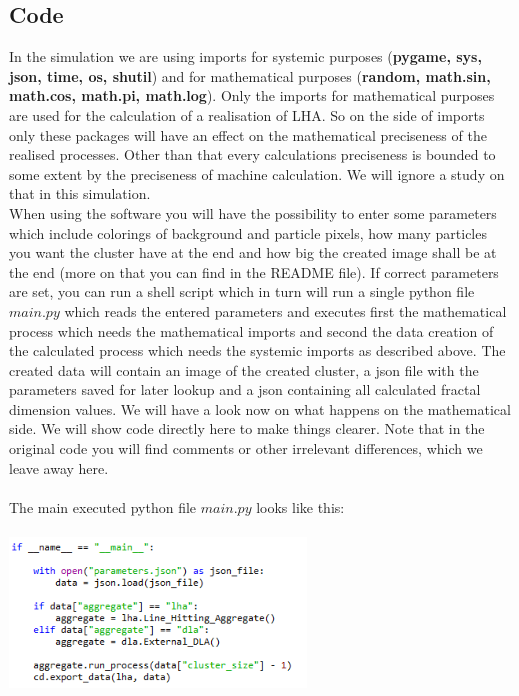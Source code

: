 \documentclass[12pt,a4paper]{scrartcl}
\numberwithin{equation}{subsection}
\newcommand{\1}{\mathbbm{1}}
\numberwithin{equation}{section}
\theoremstyle{definition}
\begin{document}
\subsection{Code}
In the simulation we are using imports for systemic purposes (\textbf{pygame, sys, json, time, os, shutil}) and for mathematical purposes (\textbf{random, math.sin, math.cos, math.pi, math.log}). Only the imports for mathematical purposes are used for the calculation of a realisation of LHA. So on the side of imports only these packages will have an effect on the mathematical preciseness of the realised processes. Other than that every calculations preciseness is bounded to some extent by the preciseness of machine calculation. We will ignore a study on that in this simulation. \\
When using the software you will have the possibility to enter some parameters which include colorings of background and particle pixels, how many particles you want the cluster have at the end and how big the created image shall be at the end (more on that you can find in the README file). If correct parameters are set, you can run a shell script which in turn will run a single python file $\mathit{main.py}$ which reads the entered parameters and executes first the mathematical process which needs the mathematical imports and second the data creation of the calculated process which needs the systemic imports as described above. The created data will contain an image of the created cluster, a json file with the parameters saved for later lookup and a json containing all calculated fractal dimension values. We will have a look now on what happens on the mathematical side. We will show code directly here to make things clearer. Note that in the original code you will find comments or other irrelevant differences, which we leave away here. \\
\\The main executed python file $\mathit{main.py}$ looks like this:\\
\\
\includegraphics[height=4cm]{images/code-snippets/mainpy.png} \\
\end{document}
